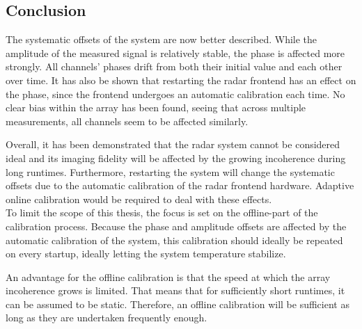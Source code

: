 \subsection{Conclusion}
The systematic offsets of the system are now better described.
While the amplitude of the measured signal is relatively stable, the phase is affected more strongly.
All channels' phases drift from both their initial value and each other over time.
It has also be shown that restarting the radar frontend has an effect on the phase,
since the frontend undergoes an automatic calibration each time.
No clear bias within the array has been found, seeing that across multiple measurements,
all channels seem to be affected similarly.

Overall, it has been demonstrated that the radar system cannot be considered ideal and
its imaging fidelity will be affected by the growing incoherence during long runtimes.
Furthermore, restarting the system will change the systematic offsets due to the automatic calibration of the radar frontend hardware.
Adaptive online calibration would be required to deal with these effects. \\

To limit the scope of this thesis, the focus is set on the offline-part of the calibration process.
Because the phase and amplitude offsets are affected by the automatic calibration of the system,
this calibration should ideally be repeated on every startup, ideally letting the system temperature stabilize.

An advantage for the offline calibration is that the speed at which the array incoherence grows is limited.
That means that for sufficiently short runtimes, it can be assumed to be static.
Therefore, an offline calibration will be sufficient as long as they are undertaken frequently enough.
\afterpage{\null\newpage}